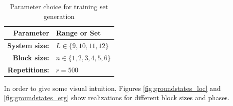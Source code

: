 \documentclass[reprint,amsmath,amssymb,aps,prb]{revtex4-2}
\begin{document}
\begin{table}[h!]
	\centering
	\begin{tabular}{rl}
		\hline
		Parameter & Range or Set \\
		\hline
		\hline 
	\textbf{System size:} & $L \in \{9, 10, 11, 12\}$ \\ 
		\textbf{Block size:} & $n \in \{1, 2, 3, 4, 5, 6\}$ \\ 
		\textbf{Repetitions:} & $r=500$\\
		\hline
	\end{tabular} 
	\caption{Parameter choice for training set generation}\label{tab:par_train}
\end{table}%

In order to give some visual intuition, Figures \ref{fig:groundstates_loc} and \ref{fig:groundstates_erg} show realizations for different block sizes and phases.
\end{document}
